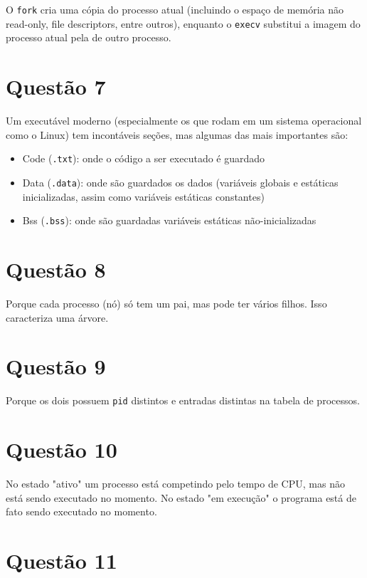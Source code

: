 \documentclass{article}
\begin{document}
O \texttt{fork} cria uma cópia do processo atual (incluindo o espaço de memória não read-only, file descriptors, entre outros), enquanto o \texttt{execv} substitui a imagem do processo atual pela de outro processo.

\section*{Questão 7}

Um executável moderno (especialmente os que rodam em um sistema operacional como o Linux) tem incontáveis seções, mas algumas das mais importantes são:

\begin{itemize}
    \item Code (\texttt{.txt}): onde o código a ser executado é guardado
    \item Data (\texttt{.data}): onde são guardados os dados (variáveis globais e estáticas inicializadas, assim como variáveis estáticas constantes)
    \item Bss (\texttt{.bss}): onde são guardadas variáveis estáticas não-inicializadas
\end{itemize}

\section*{Questão 8}

Porque cada processo (nó) só tem um pai, mas pode ter vários filhos. Isso caracteriza uma árvore.

\section*{Questão 9}

Porque os dois possuem \texttt{pid} distintos e entradas distintas na tabela de processos.

\section*{Questão 10}

No estado "ativo" um processo está competindo pelo tempo de CPU, mas não está sendo executado no momento. No estado "em execução" o programa está de fato sendo executado no momento.

\section*{Questão 11}
\end{document}
